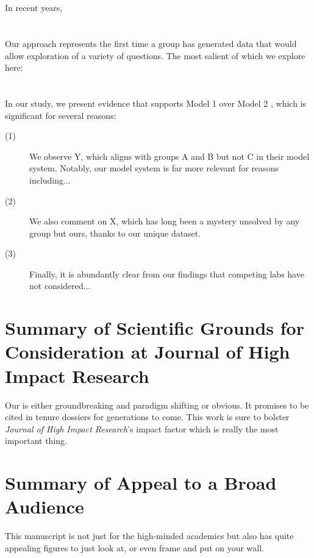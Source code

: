 \documentclass[11pt]{article}
\newcommand{\journalname}{Journal of High Impact Research} %
\begin{document}
\section{}
\noindent In recent years, \lipsum[1] 

\section{}
\noindent Our approach represents the first time a group has generated data that would allow exploration of a variety of questions. The most salient of which we explore here: 

\section{}
In our study, we present evidence that supports Model 1 \citep{zany2023quantum} over Model 2 \citep{wacky2023spaghetti}, which is significant for several reasons:

\begin{description}
  \item[(1)] We observe Y, which aligns with groups A and B but not C in their model system. Notably, our model system is far more relevant for reasons including...
  \item[(2)] We also comment on X, which has long been a mystery unsolved by any group but ours, thanks to our unique dataset.
  \item[(3)] Finally, it is abundantly clear from our findings that competing labs have not considered...
\end{description}

\section{Summary of Scientific Grounds for Consideration at \journalname}
\noindent Our is either groundbreaking and paradigm shifting or obvious. It promises to be cited in tenure dossiers for generations to come. This work is sure to bolster \textit{\journalname}'s impact factor which is really the most important thing. 

\section{Summary of Appeal to a Broad Audience}
\noindent This manuscript is not just for the high-minded academics but also has quite appealing figures to just look at, or even frame and put on your wall. 
\end{document}
